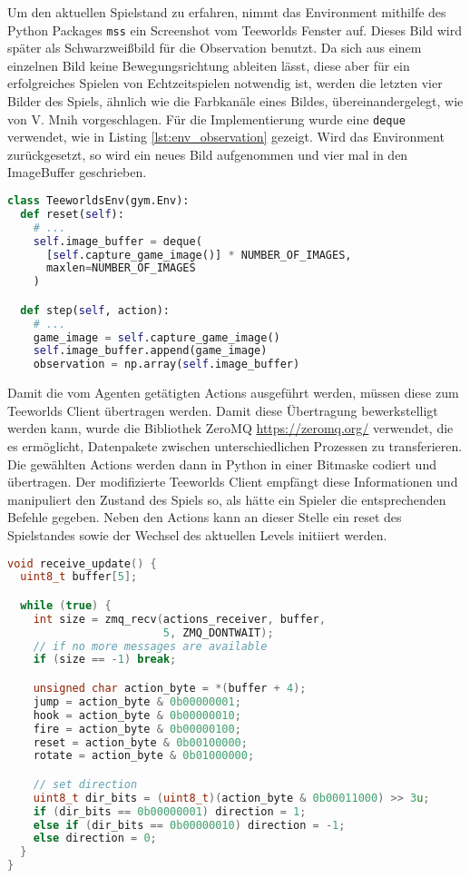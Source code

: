 \documentclass[11pt]{scrartcl}
\begin{document}
Um den aktuellen Spielstand zu erfahren, nimmt das Environment mithilfe des Python
Packages \lstinline!mss! ein Screenshot vom Teeworlds Fenster auf. Dieses Bild wird
später als Schwarzweißbild für die Observation benutzt. Da sich aus einem einzelnen Bild
keine Bewegungsrichtung ableiten lässt, diese aber für ein erfolgreiches Spielen von
Echtzeitspielen notwendig ist, werden die letzten vier Bilder des Spiels, ähnlich wie die
Farbkanäle eines Bildes, übereinandergelegt, wie von V. Mnih \cite[~S.5]{mnih2013playing}
vorgeschlagen. Für die Implementierung wurde eine \lstinline!deque! verwendet, wie in
Listing \ref{lst:env_observation} gezeigt. Wird das Environment zurückgesetzt, so wird
ein neues Bild aufgenommen und vier mal in den ImageBuffer geschrieben.
\begin{lstlisting}[language=Python, caption=Observation des Environments,
label=lst:env_observation]
class TeeworldsEnv(gym.Env):
  def reset(self):
    # ...
    self.image_buffer = deque(
      [self.capture_game_image()] * NUMBER_OF_IMAGES,
      maxlen=NUMBER_OF_IMAGES
    )

  def step(self, action):
    # ...
    game_image = self.capture_game_image()
    self.image_buffer.append(game_image)
    observation = np.array(self.image_buffer)
\end{lstlisting}
Damit die vom Agenten getätigten Actions ausgeführt werden, müssen diese zum Teeworlds Client
übertragen werden. Damit diese Übertragung bewerkstelligt werden kann, wurde die Bibliothek
ZeroMQ \url{https://zeromq.org/} verwendet, die es ermöglicht, Datenpakete zwischen
unterschiedlichen Prozessen zu transferieren. Die gewählten Actions werden dann in Python
in einer Bitmaske codiert und übertragen. Der modifizierte Teeworlds Client empfängt diese
Informationen und manipuliert den Zustand des Spiels so, als hätte ein Spieler die
entsprechenden Befehle gegeben. Neben den Actions kann an dieser Stelle ein reset des
Spielstandes sowie der Wechsel des aktuellen Levels initiiert werden.
\begin{lstlisting}[language=C++, caption=Empfangen der Actions im Teeworlds Client,
label=lst:teeclient_receive]
void receive_update() {
  uint8_t buffer[5];

  while (true) {
    int size = zmq_recv(actions_receiver, buffer,
                        5, ZMQ_DONTWAIT); 
    // if no more messages are available
    if (size == -1) break; 

    unsigned char action_byte = *(buffer + 4);
    jump = action_byte & 0b00000001;
    hook = action_byte & 0b00000010;
    fire = action_byte & 0b00000100;
    reset = action_byte & 0b00100000;
    rotate = action_byte & 0b01000000;

    // set direction
    uint8_t dir_bits = (uint8_t)(action_byte & 0b00011000) >> 3u;
    if (dir_bits == 0b00000001) direction = 1;
    else if (dir_bits == 0b00000010) direction = -1;
    else direction = 0;
  }
}
\end{lstlisting}
\end{document}
